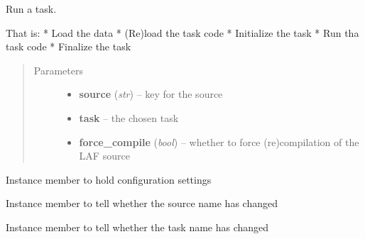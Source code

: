 \documentclass[letterpaper,10pt,english]{sphinxmanual}
\begin{document}
\begin{fulllineitems}

\begin{fulllineitems}
\label{graf/graf:graf.task.GrafTask.run}
Run a task.

That is:
* Load the data
* (Re)load the task code
* Initialize the task
* Run tha task code
* Finalize the task
\begin{quote}\begin{description}
\item[{Parameters}] \leavevmode\begin{itemize}
\item {} 
\textbf{source} (\emph{str}) --
key for the source

\item {} 
\textbf{task} --
the chosen task

\item {} 
\textbf{force\_compile} (\emph{bool}) --
whether to force (re)compilation of the LAF source

\end{itemize}

\end{description}\end{quote}

\end{fulllineitems}


\begin{fulllineitems}
\label{graf/graf:graf.task.GrafTask.settings}
Instance member to hold configuration settings

\end{fulllineitems}


\begin{fulllineitems}
\label{graf/graf:graf.task.GrafTask.source_changed}
Instance member to tell whether the source name has changed

\end{fulllineitems}


\begin{fulllineitems}
\label{graf/graf:graf.task.GrafTask.task_changed}
Instance member to tell whether the task name has changed

\end{fulllineitems}


\end{fulllineitems}
\end{document}
